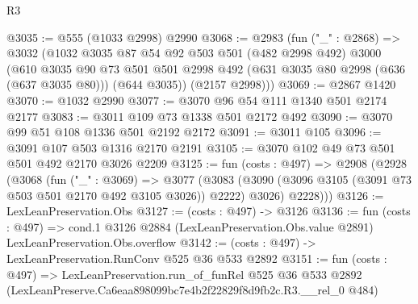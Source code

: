 \begin{lexlean}{R3}
\begin{coremodule}
@3035 := @555 (@1033 @2998) @2990
@3068 := @2983
    (fun ("_" : @2868) =>
    @3032
      (@1032
        @3035
        @87
        @54
        @92
        @503
        @501
        (@482 @2998 @492)
        @3000
        (@610
          @3035
          @90
          @73
          @501
          @501
          @2998
          @492
          (@631 @3035 @80 @2998 (@636 (@637 @3035 @80)))
          (@644 @3035))
        (@2157 @2998)))
@3069 := @2867 @1420
@3070 := @1032 @2990
@3077 := @3070 @96 @54 @111 @1340 @501 @2174 @2177
@3083 := @3011 @109 @73 @1338 @501 @2172 @492
@3090 := @3070 @99 @51 @108 @1336 @501 @2192 @2172
@3091 := @3011 @105
@3096 := @3091 @107 @503 @1316 @2170 @2191
@3105 := @3070 @102 @49 @73 @501 @501 @492 @2170 @3026 @2209
@3125 := fun (costs : @497) =>
  @2908
    (@2928
      (@3068
        (fun ("_" : @3069) =>
        @3077
          (@3083 (@3090 (@3096 @3105 (@3091 @73 @503 @501 @2170 @492 @3105 @3026)) @2222) @3026)
          @2228)))
@3126 := LexLeanPreservation.Obs
@3127 := (costs : @497) -> @3126
@3136 := fun (costs : @497) =>
  cond.{1} @3126 @2884 (LexLeanPreservation.Obs.value @2891) LexLeanPreservation.Obs.overflow
@3142 := (costs : @497) -> LexLeanPreservation.RunConv @525 @36 @533 @2892
@3151 := fun (costs : @497) =>
  LexLeanPreservation.run_of_funRel
    @525
    @36
    @533
    @2892
    (LexLeanPreserve.Ca6eaa898099bc7e4b2f22829f8d9fb2c.R3.__rel_0 @484)
\end{coremodule}
\end{lexlean}
